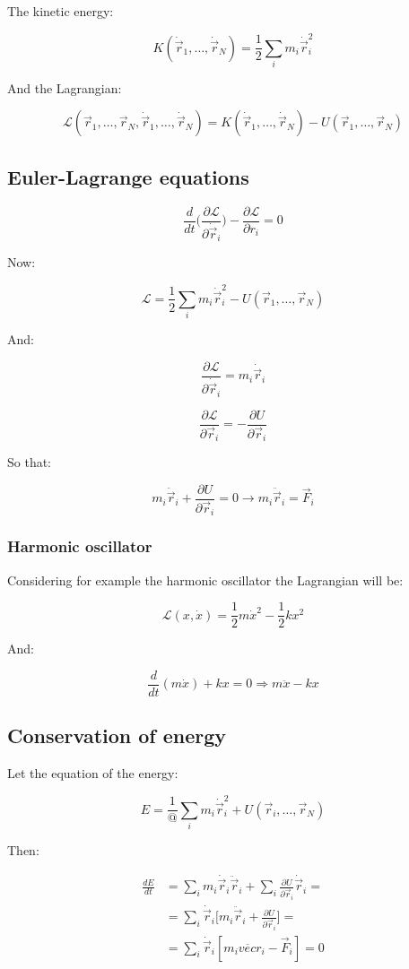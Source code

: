 The kinetic energy:

$$K(\dot{\vec{r}}_1, \dots, \dot{\vec{r}}_N) = \frac{1}{2}\sum\limits_im_i\dot{\vec{r}}_i^2$$

And the Lagrangian:

$$\mathcal{L}(\vec{r}_1, \dots, \vec{r}_N, \dot{\vec{r}}_1, \dots, \dot{\vec{r}}_N) = K(\dot{\vec{r}}_1, \dots, \dot{\vec{r}}_N)- U(\vec{r}_1, \dots, \vec{r}_N)$$

	\subsection{Euler-Lagrange equations}

	$$\frac{d}{dt}\biggl(\frac{\partial\mathcal{L}}{\partial \dot{\vec{r}}_i}\biggr)-\frac{\partial\mathcal{L}}{\partial r_i} = 0$$

	Now:

	$$\mathcal{L} = \frac{1}{2}\sum\limits_i m_i\dot{\vec{r}}_i^2 - U(\vec{r}_1, \dots, \vec{r}_N)$$

	And:

	$$\frac{\partial\mathcal{L}}{\partial\dot{\vec{r}}_i} = m_i\dot{\vec{r}}_i$$

	$$\frac{\partial\mathcal{L}}{\partial\vec{r}_i} = -\frac{\partial U}{\partial\vec{r}_i}$$

	So that:

	$$m_i\ddot{\vec{r}}_i +\frac{\partial U}{\partial\vec{r}_i} = 0\rightarrow m_i\ddot{\vec{r}}_i = \vec{F}_i$$

		\subsubsection{Harmonic oscillator}
		Considering for example the harmonic oscillator the Lagrangian will be:

		$$\mathcal{L}(x, \dot{x}) = \frac{1}{2}m\dot{x}^2-\frac{1}{2}kx^2$$

		And:

		$$\frac{d}{dt}(m\dot{x}) + kx = 0\Rightarrow m\ddot{x} - kx$$

	\subsection{Conservation of energy}
	Let the equation of the energy:

	$$E = \frac{1}{@}\sum\limits_{i}m_i\dot{\vec{r}}_i^2 + U(\vec{r}_i, \dots, \vec{r}_N)$$

	Then:

	\begin{align*}
		\frac{dE}{dt}&= \sum\limits_im_i\dot{\vec{r}}_i\ddot{\vec{r}}_i + \sum\limits_i\frac{\partial U}{\partial \vec{r}_i}\dot{\vec{r}}_i=\\
								 &=\sum\limits_i\dot{\vec{r}}_i\biggl[m_i\ddot{\vec{r}}_i+\frac{\partial U}{\partial\vec{r}_i}\biggr] = \\
								 &=\sum\limits_i\dot{\vec{r}}_i[m_i\ddot{vec{r}}_i-\vec{F}_i] = 0
	\end{align*}

